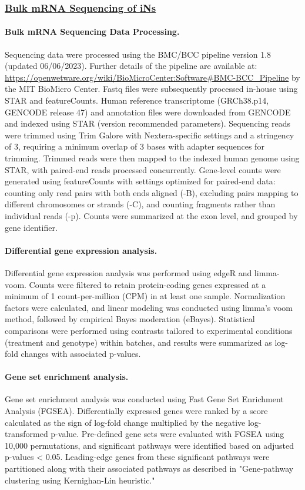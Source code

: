 \subsubsection{\underline{Bulk mRNA Sequencing of iNs}}

\paragraph{Bulk mRNA Sequencing Data Processing.}
Sequencing data were processed using the BMC/BCC pipeline version 1.8 (updated 06/06/2023). Further details of the pipeline are available at: \url{https://openwetware.org/wiki/BioMicroCenter:Software#BMC-BCC_Pipeline} by the MIT BioMicro Center. Fastq files were subsequently processed in-house using STAR and featureCounts. Human reference transcriptome (GRCh38.p14, GENCODE release 47) and annotation files were downloaded from GENCODE and indexed using STAR (version recommended parameters). Sequencing reads were trimmed using Trim Galore with Nextera-specific settings and a stringency of 3, requiring a minimum overlap of 3 bases with adapter sequences for trimming. Trimmed reads were then mapped to the indexed human genome using STAR, with paired-end reads processed concurrently. Gene-level counts were generated using featureCounts with settings optimized for paired-end data: counting only read pairs with both ends aligned (-B), excluding pairs mapping to different chromosomes or strands (-C), and counting fragments rather than individual reads (-p). Counts were summarized at the exon level, and grouped by gene identifier.

\paragraph{Differential gene expression analysis.}
Differential gene expression analysis was performed using edgeR and limma-voom. Counts were filtered to retain protein-coding genes expressed at a minimum of 1 count-per-million (CPM) in at least one sample. Normalization factors were calculated, and linear modeling was conducted using limma's voom method, followed by empirical Bayes moderation (eBayes). Statistical comparisons were performed using contrasts tailored to experimental conditions (treatment and genotype) within batches, and results were summarized as log-fold changes with associated p-values.

\paragraph{Gene set enrichment analysis.}
Gene set enrichment analysis was conducted using Fast Gene Set Enrichment Analysis (FGSEA). Differentially expressed genes were ranked by a score calculated as the sign of log-fold change multiplied by the negative log-transformed p-value. Pre-defined gene sets were evaluated with FGSEA using 10,000 permutations, and significant pathways were identified based on adjusted p-values < 0.05. Leading-edge genes from these significant pathways were partitioned along with their associated pathways as described in "Gene-pathway clustering using Kernighan-Lin heuristic."

